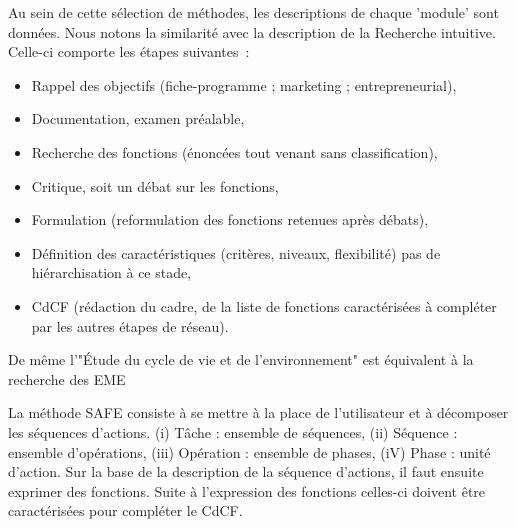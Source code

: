 Au sein de cette sélection de méthodes, les descriptions de chaque 'module' sont données.
Nous notons la similarité avec la description de la Recherche intuitive.
Celle-ci comporte les étapes suivantes~:
\begin{itemize}
\item  Rappel des objectifs (fiche-programme ; marketing ; entrepreneurial),
\item  Documentation, examen préalable,
\item  Recherche des fonctions (énoncées tout venant sans classification),
\item  Critique, soit un débat sur les fonctions,
\item  Formulation (reformulation des fonctions retenues après débats),
\item  Définition des caractéristiques (critères, niveaux, flexibilité) pas de hiérarchisation à ce stade,
\item  \gls{CdCF} (rédaction du cadre, de la liste de fonctions caractérisées à compléter par les autres étapes de réseau).
\end{itemize}
De même l'"Étude du cycle de vie et de l'environnement" est équivalent à la recherche des \gls{EME}

La méthode \gls{SAFE} consiste à se mettre à la place de l'utilisateur et à décomposer les séquences d'actions.
(i) Tâche : ensemble de séquences,
(ii) Séquence : ensemble d'opérations,
(iii) Opération : ensemble de phases,
(iV) Phase : unité d'action.
Sur la base de la description de la séquence d'actions, il faut ensuite exprimer des fonctions.
Suite à l'expression des fonctions celles-ci doivent être caractérisées pour compléter le \gls{CdCF}.

